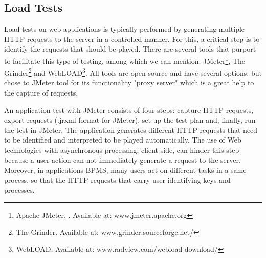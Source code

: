 \documentclass[runningheads,a4paper]{llncs}
\begin{document}
\subsection{Load Tests}

Load tests on web applications is typically performed by generating multiple HTTP requests to the server in a controlled manner. For this, a critical step is to identify the requests that should be played. There are several tools that purport to facilitate this type of testing, among which we can mention: JMeter\footnote{Apache JMeter. . Available at: www.jmeter.apache.org}, The Grinder\footnote{The Grinder. Available at: www.grinder.sourceforge.net/} and WebLOAD\footnote{WebLOAD. Available at: www.radview.com/webload-download/}. All tools are open source and have several options, but chose to JMeter tool for its functionality "proxy server" which is a great help to the capture of requests.

An application test with JMeter consists of four steps: capture HTTP requests, export requests (.jrxml format for JMeter), set up the test plan and, finally, run the test in JMeter. The application generates different HTTP requests that need to be identified and interpreted to be played automatically. The use of Web technologies with asynchronous processing, client-side, can hinder this step because a user action can not immediately generate a request to the server. Moreover, in applications BPMS, many users act on different tasks in a same process, so that the HTTP requests that carry user identifying keys and processes.
\end{document}
